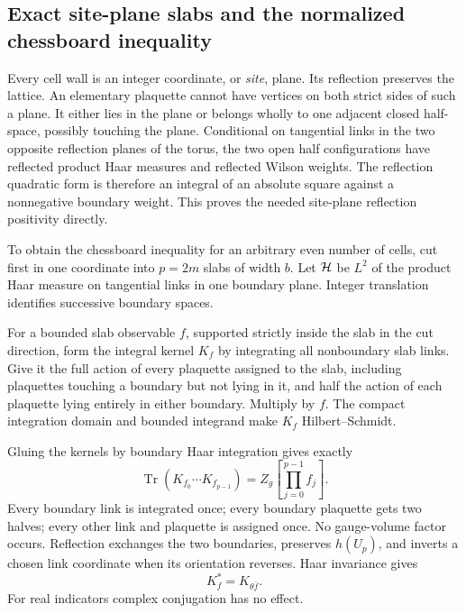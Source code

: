 \subsection{Exact site-plane slabs and the normalized chessboard inequality}
\label{fwp-slab-section}

Every cell wall is an integer coordinate, or \emph{site}, plane.
Its reflection preserves the lattice. An elementary plaquette cannot
have vertices on both strict sides of such a plane. It either lies in
the plane or belongs wholly to one adjacent closed half-space, possibly
touching the plane. Conditional on tangential links in the two opposite
reflection planes of the torus, the two open half configurations have
reflected product Haar measures and reflected Wilson weights.
The reflection quadratic form is therefore an integral of an absolute
square against a nonnegative boundary weight. This proves the needed
site-plane reflection positivity directly.

To obtain the chessboard inequality for an arbitrary even number of
cells, cut first in one coordinate into \(p=2m\) slabs of width \(b\).
Let \({\cal H}\) be \(L^2\) of the product Haar measure on tangential
links in one boundary plane. Integer translation identifies successive
boundary spaces.

For a bounded slab observable \(f\), supported strictly inside the
slab in the cut direction, form the integral kernel \(K_f\) by integrating
all nonboundary slab links. Give it the full action of every plaquette
assigned to the slab, including plaquettes touching a boundary but not
lying in it, and half the action of each plaquette lying entirely in
either boundary. Multiply by \(f\).
The compact integration domain and bounded integrand make \(K_f\)
Hilbert--Schmidt.

Gluing the kernels by boundary Haar integration gives exactly
\begin{equation}
 \operatorname{Tr}(K_{f_0}\cdots K_{f_{p-1}})
       =Z_g\!\left[\prod_{j=0}^{p-1}f_j\right].
 \label{fwp-gluing}
\end{equation}
Every boundary link is integrated once; every boundary plaquette gets
two halves; every other link and plaquette is assigned once.
No gauge-volume factor occurs. Reflection exchanges the two boundaries,
preserves \(h(U_p)\), and inverts a chosen link coordinate when its
orientation reverses. Haar invariance gives
\begin{equation}
 K_f^*=K_{\theta\overline f}.
 \label{fwp-adjoint}
\end{equation}
For real indicators complex conjugation has no effect.

